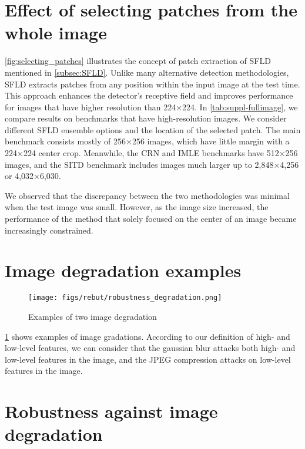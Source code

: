 \section{Effect of selecting patches from the whole image}
\label{sec:Appendix-fullimagesampling}
\cref{fig:selecting_patches} illustrates the concept of patch extraction of SFLD mentioned in \cref{subsec:SFLD}.
Unlike many alternative detection methodologies, SFLD extracts patches from any position within the input image at the test time.
This approach enhances the detector's receptive field and improves performance for images that have higher resolution than 224×224.
In \cref{tab:suppl-fullimage}, we compare results on benchmarks that have high-resolution images.
We consider different SFLD ensemble options and the location of the selected patch.
The main benchmark consists mostly of 256×256 images, which have little margin with a 224×224 center crop.
Meanwhile, the CRN and IMLE benchmarks have 512×256 images, and the SITD benchmark includes images much larger up to 2,848×4,256 or 4,032×6,030.

We observed that the discrepancy between the two methodologies was minimal when the test image was small.
However, as the image size increased, the performance of the method that solely focused on the center of an image became increasingly constrained.



\section{Image degradation examples}

\begin{figure}[t]
    \centering
    \texttt{[image: figs/rebut/robustness\_degradation.png]}
    \caption{Examples of two image degradation}
    \label{fig:robustness_examples}
\end{figure}

\cref{fig:robustness_examples} shows examples of image gradations.
According to our definition of high- and low-level features, we can consider that the gaussian blur attacks both high- and low-level features in the image, and the JPEG compression attacks on low-level features in the image.


\section{Robustness against image degradation}
\label{sec:supple_robustness}


